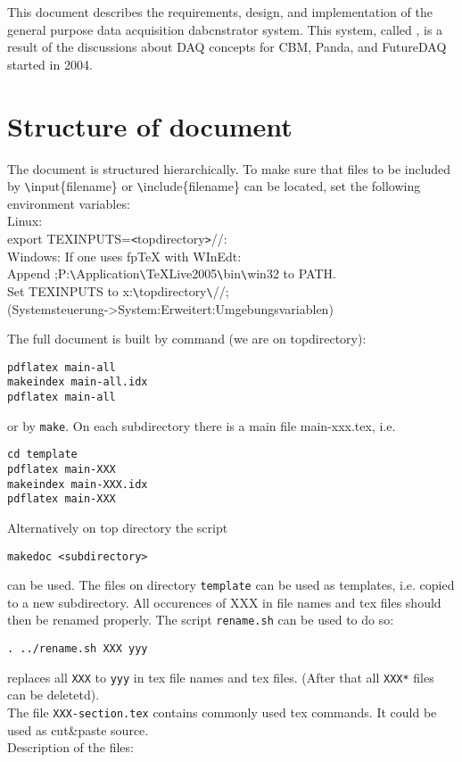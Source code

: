 
This document describes the requirements, design, and implementation of the
general purpose data acquisition dabcnstrator system.
This system, called {\DDA}, is a result of the discussions about DAQ concepts for CBM,
Panda, and FutureDAQ started in 2004.

\section{Structure of document}
The document is structured hierarchically. To make sure that files
to be included by \verb+\+input\{filename\} or \verb+\+include\{filename\}
can be located, set the following environment variables:\\
Linux:\\
export TEXINPUTS=\verb+<+topdirectory\verb+>+//:\\
Windows: If one uses fpTeX with WInEdt:\\
Append ;P:\verb+\+Application\verb+\+TeXLive2005\verb+\+bin\verb+\+win32 to PATH.\\
Set TEXINPUTS to x:\verb+\+topdirectory\verb+\+//;\\
(Systemsteuerung->System:Erweitert:Umgebungsvariablen)

The full document is built by command (we are on topdirectory):
\begin{verbatim}
pdflatex main-all
makeindex main-all.idx
pdflatex main-all
\end{verbatim}
or by {\tt make}.
On each subdirectory there is a main file main-xxx.tex, i.e.
\begin{verbatim}
cd template
pdflatex main-XXX
makeindex main-XXX.idx
pdflatex main-XXX
\end{verbatim}
Alternatively on top directory the script 
\begin{verbatim}
makedoc <subdirectory>
\end{verbatim}
can be used.
The files on directory {\tt template} can be used as templates, i.e. copied to a new subdirectory.
All occurences of XXX in file names and tex files should then be renamed properly.
The script {\tt rename.sh} can be used to do so:
\begin{verbatim}
. ../rename.sh XXX yyy
\end{verbatim}
replaces all {\tt XXX} to {\tt yyy} in tex file names and tex files.
(After that all {\tt *XXX*} files can be deletetd).\\
The file {\tt XXX-section.tex} contains commonly used tex commands.
It could be used as cut\&paste source.\\
Description of the files:
